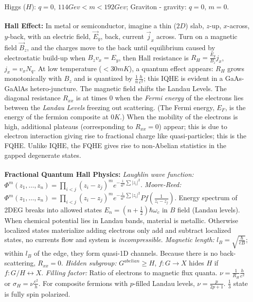 Higgs ($H$): $q=0$, $114 Gev<m< 192 Gev$; 
Graviton - gravity: $q=0$, $m=0$. 
\\
\\
{\bf Hall Effect:}  In metal or semiconductor, imagine a thin ($2D$)
slab, $z$-up, $x$-across, $y$-back,
with an electric field, ${\vec E}_y$, back, current ${\vec j}_x$ across.  Turn on
a magnetic field ${\vec B}_z$, and the charges move to the back until equilibrium caused
by electrostatic build-up when $B_z v_x = E_y$, then Hall resistance
is $R_H= {\frac {E_y} {B_z}} j_x$, $j_x= v_x N_q$.  At low temperature ($<30 mK$), a quantum
effect appears:  $R_H$ grows monotonically with $B_z$ and is quantized by 
${\frac 1 n} {\frac h {e^2}}$; this IQHE is evident in a GaAs-GaAlAs hetero-juncture.
The magnetic field shifts the Landau Levels.
The diagonal resistance $R_{xx}$ is at times $0$ when the 
\emph{Fermi energy} of the electrons
lies between the 
\emph{Landau Levels} freezing out scattering.  (The Fermi energy, $E_F$,
is the energy of the fermion composite at $0K$.)  When the mobility of the electrons is high, 
additional plateaus (corresponding to $R_{xx}=0$) appear; this is due to electron interaction
giving rise to fractional charge like quasi-particles; this is the FQHE.  Unlike IQHE, the
FQHE gives rise to non-Abelian statistics in the gapped degenerate states.
\\
\\
{\bf Fractional Quantum Hall Physics:}
\emph{Laughlin wave function:} 
$\Phi^m (z_1, \ldots, z_n)= \prod_{i<j} (z_i-z_j)^m e^{-{\frac 1 {4l^2}} \sum |z_i|^2}$.
\emph{Moore-Reed:} 
$\Phi^m(z_1, \ldots, z_n)= \prod_{i<j} (z_i-z_j)^m e^{-{\frac 1 {4l^2}} \sum |z_i|^2}
Pf({\frac 1 {z_i - z_j}})$.
Energy spectrum of 2DEG breaks into allowed states 
$E_n= (n+{\frac 1 2}) \hbar \omega_c$ in $B$ field (Landau levels).  When chemical potential
lies in Landau bands, material is metallic.  Otherwise localized states materialize adding
electrons only add and subtract localized states, no currents flow and system is
\emph{incompressible}.
\emph{Magnetic length:} $l_B= {\sqrt {\frac \hbar {eB}}}$; within $l_B$ of the edge,
they form quasi-1D channels.  Because there is no back-scattering, $R_{xx}=0$.
\emph{Hidden subgroup:} $G^{abelian} \ge H$, $f: G \rightarrow X$ hides $H$ if
$f: G/H \leftrightarrow X$.
\emph{Filling factor:}  Ratio of electrons to magnetic flux quanta.
$\nu= {\frac 1 {R_H}} {\frac h {e^2}}$
or $\sigma_H= \nu {\frac {e^2} h}$.  For composite fermions with $p$-filled Landau
levels, $\nu= {\frac p {2p+1}}$.
${\frac 1 3}$ state is fully spin polarized.
